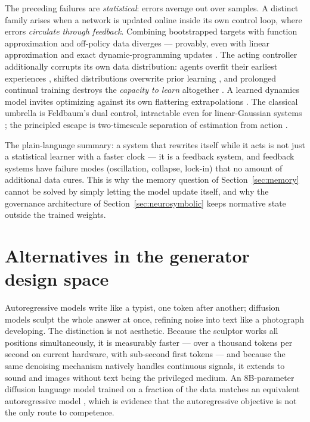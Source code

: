 \documentclass[11pt,a4paper]{article}
\begin{document}
The preceding failures are \emph{statistical}: errors average out over
samples. A distinct family arises when a network is updated online inside its
own control loop, where errors \emph{circulate through feedback}. Combining
bootstrapped targets with function approximation and off-policy data diverges
--- provably, even with linear approximation and exact dynamic-programming
updates \autocite{baird1995residual,tsitsiklis1997analysis,
vanhasselt2018deadly}. The acting controller additionally corrupts its own
data distribution: agents overfit their earliest experiences
\autocite{nikishin2022primacy}, shifted distributions overwrite prior
learning \autocite{french1999catastrophic}, and prolonged continual training
destroys the \emph{capacity to learn} altogether \autocite{dohare2024plasticity}.
A learned dynamics model invites optimizing against its own flattering
extrapolations \autocite{janner2019trust}. The classical umbrella is
Feldbaum's dual control, intractable even for linear-Gaussian systems
\autocite{wittenmark1995adaptive}; the principled escape is two-timescale
separation of estimation from action \autocite{borkar1997stochastic}.

The plain-language summary: a system that rewrites itself while it acts is
not just a statistical learner with a faster clock --- it is a feedback
system, and feedback systems have failure modes (oscillation, collapse,
lock-in) that no amount of additional data cures. This is why the memory
question of Section~\ref{sec:memory} cannot be solved by simply letting the
model update itself, and why the governance architecture of
Section~\ref{sec:neurosymbolic} keeps normative state outside the trained
weights.

\section{Alternatives in the generator design space}
\label{sec:alternatives}

Autoregressive models write like a typist, one token after another;
diffusion models sculpt the whole answer at once, refining noise into text
like a photograph developing. The distinction is not aesthetic. Because the
sculptor works all positions simultaneously, it is measurably faster ---
over a thousand tokens per second on current hardware, with sub-second first
tokens \autocite{inception2025mercury} --- and because the same denoising
mechanism natively handles continuous signals, it extends to sound and
images without text being the privileged medium. An 8B-parameter diffusion
language model trained on a fraction of the data matches an equivalent
autoregressive model \autocite{nie2025llada}, which is evidence that the
autoregressive objective is not the only route to competence.
\end{document}
